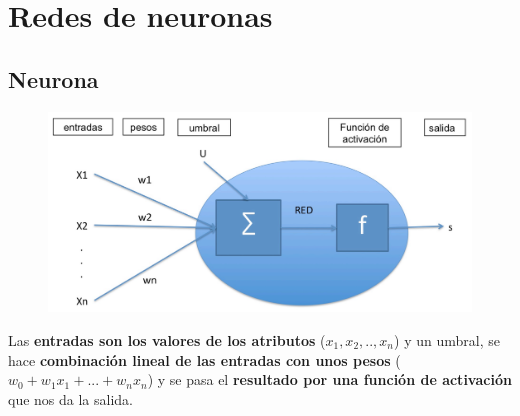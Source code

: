 \documentclass[12pt, twoside, openright]{report} %
\begin{document}
\section{Redes de neuronas}

\subsection{Neurona}

\begin{figure}[H]
	{\includegraphics[scale=.2]{image-20210312101135112.png}}
\end{figure}
Las \textbf{entradas son los valores de los atributos}
(\(x_1,x_2,..,x_n\)) y un umbral, se hace \textbf{combinación lineal de
	las entradas con unos pesos} (\(w_0+w_1x_1+...+w_nx_n\)) y se pasa el
\textbf{resultado por una función de activación} que nos da la salida.
\end{document}
